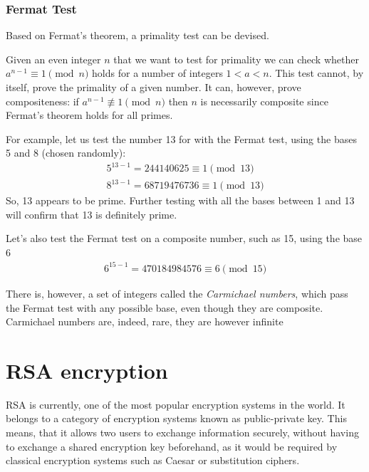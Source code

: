 \documentclass[12pt, titlepage]{article}
\begin{document}
    \subsubsection{Fermat Test}
        Based on Fermat's theorem, a primality test can be devised.

        Given an even integer $n$ that we want to test for primality we can check whether
        $a^{n-1} \equiv 1 \pmod{n}$ holds for a number of integers $1<a<n$.  This test cannot,
        by itself, prove the primality of a given number. It can, however, prove compositeness:
        if $a^{n-1} \not\equiv 1 \pmod{n}$ then $n$ is necessarily composite since Fermat's
        theorem holds for all primes. \cite{primality_akalin}

        For example, let us test the number 13 for with the Fermat test, using the bases 5 and 8
        (chosen randomly):
        \begin{align*}
            5^{13-1} = 244140625   \equiv 1 \pmod{13}\\
            8^{13-1} = 68719476736 \equiv 1 \pmod{13}
        \end{align*}
        So, 13 appears to be prime. Further testing with all the bases between 1 and 13 will
        confirm that 13 is definitely prime.

        Let's also test the Fermat test on a composite number, such as 15, using the base 6
        \begin{align*}
            6^{15-1} = 470184984576 \equiv 6 \pmod{15}
        \end{align*}

        There is, however, a set of integers called the \emph{Carmichael numbers}, which pass
        the Fermat test with any possible base, even though they are composite. Carmichael
        numbers are, indeed, rare, they are however infinite



\section{RSA encryption}
RSA \cite{rsa} is currently, one of the most popular encryption systems in the world.  It
belongs to a category of encryption systems known as public-private key.  This means, that
it allows two users to exchange information securely, without having to exchange a shared
encryption key beforehand, as it would be required by classical encryption systems such as
Caesar or substitution ciphers. 
\end{document}
